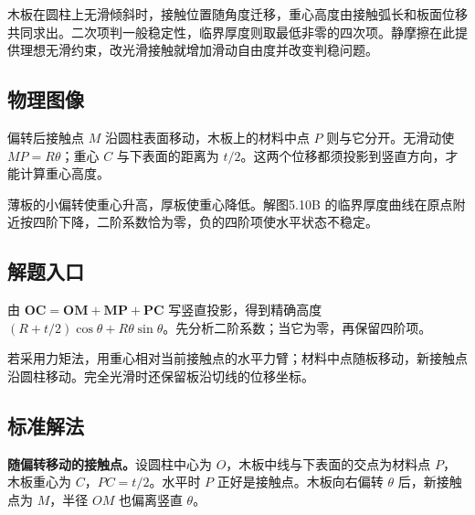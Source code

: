 \documentclass[UTF8,fontset=fandol,a4paper,11pt]{ctexart}
\newcommand{\vect}[1]{\bm{#1}}
\begin{document}
木板在圆柱上无滑倾斜时，接触位置随角度迁移，重心高度由接触弧长和板面位移共同求出。二次项判一般稳定性，临界厚度则取最低非零的四次项。静摩擦在此提供理想无滑约束，改光滑接触就增加滑动自由度并改变判稳问题。




\subsection*{物理图像}

偏转后接触点 $M$ 沿圆柱表面移动，木板上的材料中点 $P$ 则与它分开。无滑动使 $MP=R\theta$；重心 $C$ 与下表面的距离为 $t/2$。这两个位移都须投影到竖直方向，才能计算重心高度。

薄板的小偏转使重心升高，厚板使重心降低。解图5.10B 的临界厚度曲线在原点附近按四阶下降，二阶系数恰为零，负的四阶项使水平状态不稳定。



\subsection*{解题入口}

由 $\vect{OC}=\vect{OM}+\vect{MP}+\vect{PC}$ 写竖直投影，得到精确高度 $(R+t/2)\cos\theta+R\theta\sin\theta$。先分析二阶系数；当它为零，再保留四阶项。

若采用力矩法，用重心相对当前接触点的水平力臂；材料中点随板移动，新接触点沿圆柱移动。完全光滑时还保留板沿切线的位移坐标。



\subsection*{标准解法}

\textbf{随偏转移动的接触点。}设圆柱中心为 $O$，木板中线与下表面的交点为材料点 $P$，木板重心为 $C$，$PC=t/2$。水平时 $P$ 正好是接触点。木板向右偏转 $\theta$ 后，新接触点为 $M$，半径 $OM$ 也偏离竖直 $\theta$。
\end{document}
